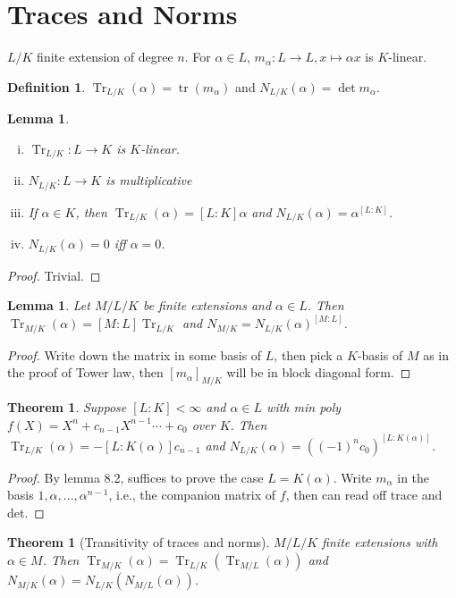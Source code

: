 \documentclass{article}
\theoremstyle{definition}
\newtheorem*{defn*}{Definition}
\theoremstyle{remark}
\theoremstyle{plain}
\newtheorem{lem}[defn]{Lemma}
\newtheorem{thm}[defn]{Theorem}
\begin{document}
\section{Traces and Norms}
$L/K$ finite extension of degree $n$. For $\alpha\in L$, $m_\alpha:L\to L, x\mapsto \alpha x$ is $K$-linear.
\newcommand{\Tr}{\operatorname{Tr}}
\begin{defn*}
$\Tr_{L/K}(\alpha)=\operatorname{tr}(m_\alpha)$ and $N_{L/K}(\alpha)=\det m_\alpha$.
\end{defn*}
\begin{lem}
    \begin{enumerate}[(i)]
        \item $\Tr_{L/K}:L\to K$ is $K$-linear.
        \item $N_{L/K}:L\to K$ is multiplicative
        \item If $\alpha\in K$, then $\Tr_{L/K}(\alpha)=[L:K]\alpha$ and $N_{L/K}(\alpha)=\alpha^{[L:K]}$.
        \item $N_{L/K}(\alpha)=0$ iff $\alpha=0$.
    \end{enumerate}
\end{lem}
\begin{proof}
    Trivial.
\end{proof}
\begin{lem}
    Let $M/L/K$ be finite extensions and $\alpha\in L$. Then $\Tr_{M/K}(\alpha)=[M:L]\Tr_{L/K}$ and $N_{M/K}=N_{L/K}(\alpha)^{[M:L]}$.
\end{lem}
\begin{proof}
    Write down the matrix in some basis of $L$, then pick a $K$-basis of $M$ as in the proof of Tower law, then $[m_\alpha]_{M/K}$ will be in block diagonal form.
\end{proof}
\begin{thm}
    Suppose $[L:K]<\infty$ and $\alpha\in L$ with min poly $f(X)=X^n+c_{n-1}X^{n-1}\cdots+c_0$ over $K$. Then $\Tr_{L/K}(\alpha)=-[L:K(\alpha)]c_{n-1}$ and $N_{L/K}(\alpha)=((-1)^nc_0)^{[L:K(\alpha)]}$.
\end{thm}
\begin{proof}
    By lemma 8.2, suffices to prove the case $L=K(\alpha)$. Write $m_\alpha$ in the basis $1,\alpha,...,\alpha^{n-1}$, i.e., the companion matrix of $f$, then can read off trace and det.
\end{proof}
\begin{thm}[Transitivity of traces and norms]
    $M/L/K$ finite extensions with $\alpha\in M$. Then $\Tr_{M/K}(\alpha)=\Tr_{L/K}(\Tr_{M/L}(\alpha))$ and $N_{M/K}(\alpha)=N_{L/K}(N_{M/L}(\alpha))$.
\end{thm}
\end{document}
